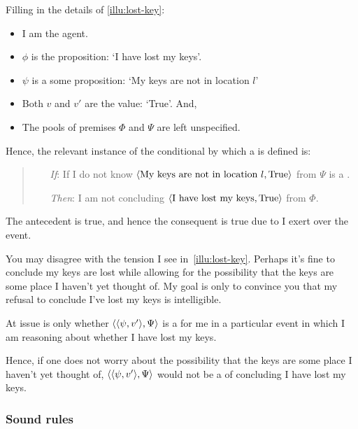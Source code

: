 \begin{note}
  Filling in the details of \autoref{illu:lost-key}:
  \begin{itemize}[noitemsep]
  \item
    I am the agent.
  \item
    \(\phi\) is the proposition: `I have lost my keys'.
  \item
    \(\psi\) is a some proposition: `My keys are not in location \(l\)'
  \item
    Both \(v\) and \(v'\) are the value: `True'.
    And,
  \item
    The pools of premises \(\Phi\) and \(\Psi\) are left unspecified.
  \end{itemize}

  Hence, the relevant instance of the conditional by which a \requ{} is defined is:

  \begin{quote}
    \begin{itemize}
    \item[\emph{If}:]
      If I do not know \(\langle \text{My keys are not in location }l, \text{True} \rangle\) from \(\Psi\) is a \fc{}.
    \item[\emph{Then}:]
      I am not concluding \(\langle \text{I have lost my keys}, \text{True} \rangle\) from \(\Phi\).
    \end{itemize}
  \end{quote}

  The antecedent is true, and hence the consequent is true due to \ninf{} I exert over the event.
\end{note}

\begin{note}
  You may disagree with the tension I see in~\autoref{illu:lost-key}.
  Perhaps it's fine to conclude my keys are lost while allowing for the possibility that the keys are some place I haven't yet thought of.
  My goal is only to convince you that my refusal to conclude I've lost my keys is intelligible.

  At issue is only whether \(\langle \langle \psi, v' \rangle, \Psi \rangle\) is a \requ{} for me in a particular event in which I am reasoning about whether I have lost my keys.

  Hence, if one does not worry about the possibility that the keys are some place I haven't yet thought of, \(\langle \langle \psi, v' \rangle, \Psi \rangle\) would not be a  of concluding I have lost my keys.
\end{note}

\subsubsection{Sound rules}

